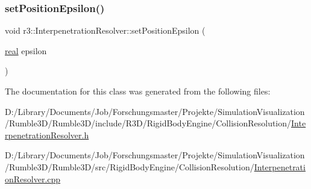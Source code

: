 \mbox{\label{classr3_1_1_interpenetration_resolver_ad70802061f5f8868622cc5024a10f8cf}} 
\subsubsection{\texorpdfstring{set\+Position\+Epsilon()}{setPositionEpsilon()}}
{\footnotesize\ttfamily void r3\+::\+Interpenetration\+Resolver\+::set\+Position\+Epsilon (\begin{DoxyParamCaption}\item[{\mbox{\hyperlink{namespacer3_ab2016b3e3f743fb735afce242f0dc1eb}{real}}}]{epsilon }\end{DoxyParamCaption})}



The documentation for this class was generated from the following files\+:\begin{DoxyCompactItemize}
\item 
D\+:/\+Library/\+Documents/\+Job/\+Forschungsmaster/\+Projekte/\+Simulation\+Visualization/\+Rumble3\+D/\+Rumble3\+D/include/\+R3\+D/\+Rigid\+Body\+Engine/\+Collision\+Resolution/\mbox{\hyperlink{_interpenetration_resolver_8h}{Interpenetration\+Resolver.\+h}}\item 
D\+:/\+Library/\+Documents/\+Job/\+Forschungsmaster/\+Projekte/\+Simulation\+Visualization/\+Rumble3\+D/\+Rumble3\+D/src/\+Rigid\+Body\+Engine/\+Collision\+Resolution/\mbox{\hyperlink{_interpenetration_resolver_8cpp}{Interpenetration\+Resolver.\+cpp}}\end{DoxyCompactItemize}
